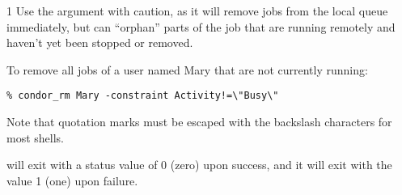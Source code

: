 \begin{ManPage}{\label{man-condor-rm}}{1}
Use the  argument with caution, as it will remove jobs
from the local queue immediately, but can ``orphan'' parts of the job
that are running remotely and haven't yet been stopped or removed.

\Examples
To remove all jobs of a user named Mary that are not currently running:
\footnotesize
\begin{verbatim}
% condor_rm Mary -constraint Activity!=\"Busy\"
\end{verbatim}
\normalsize
Note that quotation marks must be escaped with the backslash characters
for most shells.

\ExitStatus

 will exit with a status value of 0 (zero) upon success,
and it will exit with the value 1 (one) upon failure.

\end{ManPage}
